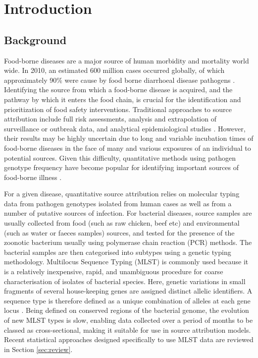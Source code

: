 \section{Introduction}

\subsection{Background}


Food-borne diseases are a major source of human morbidity and mortality world wide. In 2010, an estimated 600 million cases occurred globally, of which approximately 90\% were cause by food 
borne diarrhoeal disease pathogens \citep{HavEtAl2015}.  Identifying the source from which a food-borne disease is acquired, and the pathway by which it enters the food chain, is crucial for the 
identification and prioritization of food safety interventions.  Traditional approaches to source attribution include full risk assessments, analysis and extrapolation of surveillance or outbreak data, and
analytical epidemiological studies \citep{CrGrAn02}.  However, their results may be highly uncertain due to long and variable incubation times of food-borne diseases in the face of many and various 
exposures of an individual to potential sources.  Given this difficulty, quantitative methods using pathogen genotype frequency have become popular for identifying important sources of food-borne 
illness \citep{MulJonNob09}.  

For a given disease, quantitative source attribution relies on molecular typing data from pathogen genotypes isolated from human cases as well as from a number of putative sources of infection.   
For bacterial diseases, source samples are usually collected from food (such as raw chicken, beef etc) and environmental (such as water or faeces samples) sources, and tested for the presence of 
the zoonotic bacterium usually using polymerase chain reaction (PCR) methods. The bacterial samples are then categorised into subtypes using a genetic typing methodology.  Multilocus Sequence Typing (MLST) is commonly used because it is a relatively 
inexpensive, rapid, and unambiguous procedure for coarse characterisation of isolates of bacterial species. Here, genetic variations in small fragments of several house-keeping genes are assigned 
distinct allelic identifiers.  A sequence type is therefore defined as a unique combination of alleles at each gene locus \citep{DingColWar01}.  Being defined on conserved regions of the bacterial 
genome, the evolution of new MLST types is slow, enabling data collected over a period of months to be classed as cross-sectional, making it suitable for use in source attribution models.  Recent 
statistical approaches designed specifically to use MLST data are reviewed in Section \ref{sec:review}. 

